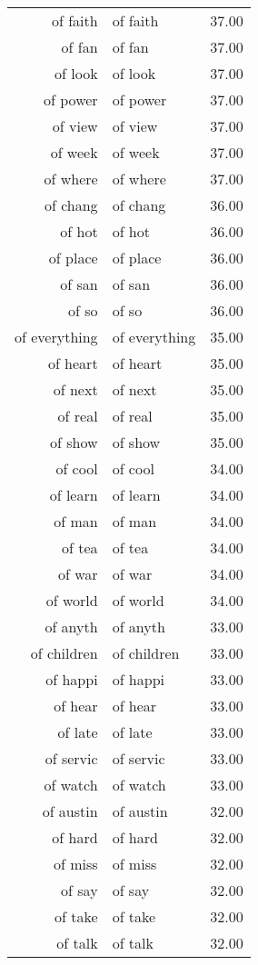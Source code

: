 \begin{table}[ht]
\begin{tabular}{rlr}
  of faith & of faith & 37.00 \\ 
  of fan & of fan & 37.00 \\ 
  of look & of look & 37.00 \\ 
  of power & of power & 37.00 \\ 
  of view & of view & 37.00 \\ 
  of week & of week & 37.00 \\ 
  of where & of where & 37.00 \\ 
  of chang & of chang & 36.00 \\ 
  of hot & of hot & 36.00 \\ 
  of place & of place & 36.00 \\ 
  of san & of san & 36.00 \\ 
  of so & of so & 36.00 \\ 
  of everything & of everything & 35.00 \\ 
  of heart & of heart & 35.00 \\ 
  of next & of next & 35.00 \\ 
  of real & of real & 35.00 \\ 
  of show & of show & 35.00 \\ 
  of cool & of cool & 34.00 \\ 
  of learn & of learn & 34.00 \\ 
  of man & of man & 34.00 \\ 
  of tea & of tea & 34.00 \\ 
  of war & of war & 34.00 \\ 
  of world & of world & 34.00 \\ 
  of anyth & of anyth & 33.00 \\ 
  of children & of children & 33.00 \\ 
  of happi & of happi & 33.00 \\ 
  of hear & of hear & 33.00 \\ 
  of late & of late & 33.00 \\ 
  of servic & of servic & 33.00 \\ 
  of watch & of watch & 33.00 \\ 
  of austin & of austin & 32.00 \\ 
  of hard & of hard & 32.00 \\ 
  of miss & of miss & 32.00 \\ 
  of say & of say & 32.00 \\ 
  of take & of take & 32.00 \\ 
  of talk & of talk & 32.00 \\ 

\end{tabular}
\end{table}
